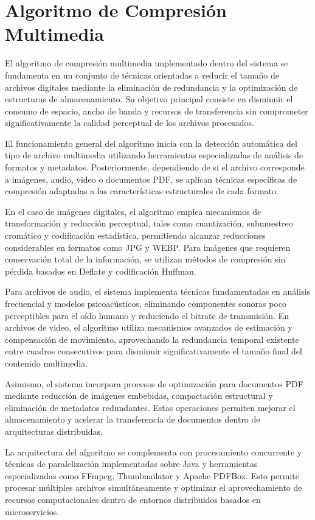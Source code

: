 \section{Algoritmo de Compresión Multimedia}

El algoritmo de compresión multimedia implementado dentro del sistema se fundamenta en un conjunto de técnicas orientadas a reducir el tamaño de archivos digitales mediante la eliminación de redundancia y la optimización de estructuras de almacenamiento. Su objetivo principal consiste en disminuir el consumo de espacio, ancho de banda y recursos de transferencia sin comprometer significativamente la calidad perceptual de los archivos procesados.

El funcionamiento general del algoritmo inicia con la detección automática del tipo de archivo multimedia utilizando herramientas especializadas de análisis de formatos y metadatos. Posteriormente, dependiendo de si el archivo corresponde a imágenes, audio, video o documentos PDF, se aplican técnicas específicas de compresión adaptadas a las características estructurales de cada formato.

En el caso de imágenes digitales, el algoritmo emplea mecanismos de transformación y reducción perceptual, tales como cuantización, submuestreo cromático y codificación estadística, permitiendo alcanzar reducciones considerables en formatos como JPG y WEBP. Para imágenes que requieren conservación total de la información, se utilizan métodos de compresión sin pérdida basados en Deflate y codificación Huffman.

Para archivos de audio, el sistema implementa técnicas fundamentadas en análisis frecuencial y modelos psicoacústicos, eliminando componentes sonoras poco perceptibles para el oído humano y reduciendo el bitrate de transmisión. En archivos de video, el algoritmo utiliza mecanismos avanzados de estimación y compensación de movimiento, aprovechando la redundancia temporal existente entre cuadros consecutivos para disminuir significativamente el tamaño final del contenido multimedia.

Asimismo, el sistema incorpora procesos de optimización para documentos PDF mediante reducción de imágenes embebidas, compactación estructural y eliminación de metadatos redundantes. Estas operaciones permiten mejorar el almacenamiento y acelerar la transferencia de documentos dentro de arquitecturas distribuidas.

La arquitectura del algoritmo se complementa con procesamiento concurrente y técnicas de paralelización implementadas sobre Java y herramientas especializadas como FFmpeg, Thumbnailator y Apache PDFBox. Esto permite procesar múltiples archivos simultáneamente y optimizar el aprovechamiento de recursos computacionales dentro de entornos distribuidos basados en microservicios.

